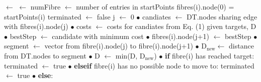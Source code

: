 \begin{algorithm}
  \centering
  \begin{algorithmic}
     $\leftarrow$  
    \State [DT, D] $\leftarrow$ 
    \State numFibre $\leftarrow$ number of entries in startPoints
     
    \State fibres(i).node(0) = startPoints(i)
    \EndFor
     
    \State terminated $\leftarrow$ false
    \State j $\leftarrow$ 0
    \State{} 
    \State \hspace{1em} $\bullet$ candiates $\leftarrow$ DT.nodes sharing edge with fibres(i).node(j)
    \State{}    
    \State \hspace{1em} $\bullet$ costs $\leftarrow$ costs for candiates from Eq. (1) given targets, D
    \State \hspace{1em} $\bullet$ bestStep $\leftarrow$ candidate with minimum cost
    \State{}       
    \State \hspace{1em} $\bullet$ fibres(i).node(j+1) $\leftarrow$ bestStep
    \State{} 
    \State \hspace{1em} $\bullet$ segment $\leftarrow$ vector from fibre(i).node(j) to fibre(i).node(j+1)
    \State \hspace{1em} $\bullet$ D$_\mathrm{new} \leftarrow$ distance from DT.nodes to segment
    \State \hspace{1em} $\bullet$ D $\leftarrow$ min(D, D$_\mathrm{new}$)
    \State{}
    \State \hspace{1em} $\bullet$ \textbf{if} fibre(i) has reached target:
    \State \hspace{3em} terminated $\leftarrow$ true
    \State \hspace{1em} $\bullet$ \textbf{elseif} fibre(i) has no possible node to move to:
    \State \hspace{3em} terminated $\leftarrow$ true
    \State \hspace{1em} $\bullet$ \textbf{else}:

\end{algorithmic}
\end{algorithm}
